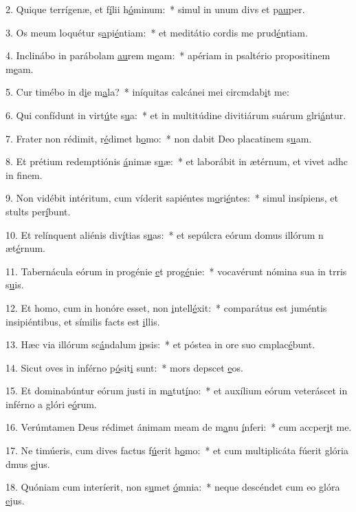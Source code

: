2. Quique terrígenæ, et f\uline{í}lii h\uline{ó}minum:~* simul in unum divs et p\uline{au}per.\par 
3. Os meum loquétur s\uline{a}pi\uline{é}ntiam:~* et meditátio cordis me prud\uline{é}ntiam.\par 
4. Inclinábo in parábolam \uline{au}rem m\uline{e}am:~* apériam in psaltério propositinem m\uline{e}am.\par 
5. Cur timébo in d\uline{i}e m\uline{a}la?~* iníquitas calcánei mei circmdab\uline{i}t me:\par 
6. Qui confídunt in virt\uline{ú}te s\uline{u}a:~* et in multitúdine divitiárum suárum glri\uline{á}ntur.\par 
7. Frater non rédimit, r\uline{é}dimet h\uline{o}mo:~* non dabit Deo placatinem s\uline{u}am.\par 
8. Et prétium redemptiónis \uline{á}nimæ s\uline{u}æ:~* et laborábit in ætérnum, et vivet adhc in f\uline{i}nem.\par 
9. Non vidébit intéritum, cum víderit sapiéntes m\uline{o}ri\uline{é}ntes:~* simul insípiens, et stults per\uline{í}bunt.\par 
10. Et relínquent aliénis div\uline{í}tias s\uline{u}as:~* et sepúlcra eórum domus illórum n æt\uline{é}rnum.\par 
11. Tabernácula eórum in progénie \uline{e}t prog\uline{é}nie:~* vocavérunt nómina sua in trris s\uline{u}is.\par 
12. Et homo, cum in honóre esset, non \uline{i}ntell\uline{é}xit:~* comparátus est juméntis insipiéntibus, et símilis facts est \uline{i}llis.\par 
13. Hæc via illórum sc\uline{á}ndalum \uline{i}psis:~* et póstea in ore suo cmplac\uline{é}bunt.\par 
14. Sicut oves in inférno p\uline{ó}sit\uline{i} sunt:~* mors depscet \uline{e}os.\par 
15. Et dominabúntur eórum justi in m\uline{a}tut\uline{í}no:~* et auxílium eórum veteráscet in inférno a glóri e\uline{ó}rum.\par 
16. Verúmtamen Deus rédimet ánimam meam de m\uline{a}nu \uline{í}nferi:~* cum accper\uline{i}t me.\par 
17. Ne timúeris, cum dives factus f\uline{ú}erit h\uline{o}mo:~* et cum multiplicáta fúerit glória dmus \uline{e}jus.\par 
18. Quóniam cum interíerit, non s\uline{u}met \uline{ó}mnia:~* neque descéndet cum eo glóra \uline{e}jus.\par 
